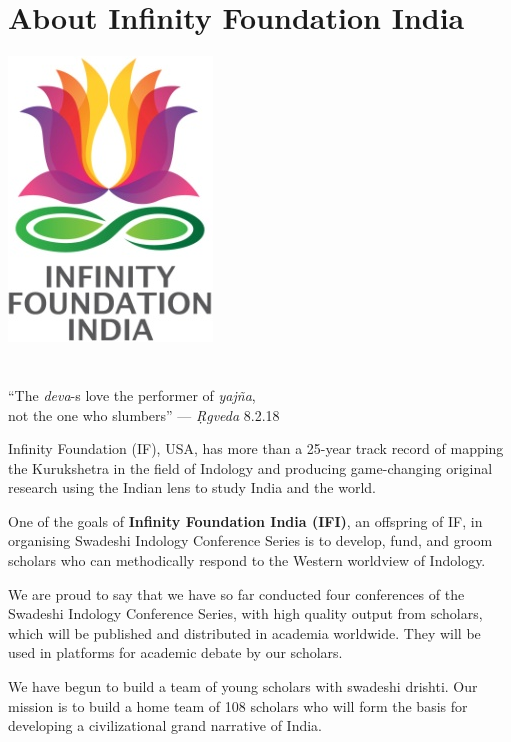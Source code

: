 
\chapter*{About Infinity Foundation India}\label{about}

\begin{center}
 \includegraphics[scale=0.23]{images/logo.png}\\\\\\
 “The \textit{deva}-s love the performer of \textit{yajña},\\ 
 not the one who slumbers” — \textit{Ṛgveda} 8.2.18
\end{center}

Infinity Foundation (IF), USA, has more than a 25-year track record of mapping the Kurukshetra in the field of Indology and producing game-changing original research using the Indian lens to study India and the world.

One of the goals of \textbf{Infinity Foundation India (IFI)}, an offspring of IF, in organising Swadeshi Indology Conference Series is to develop, fund, and groom scholars who can methodically respond to the Western worldview of Indology.

We are proud to say that we have so far conducted four conferences of the Swadeshi Indology Conference Series, with high quality output from scholars, which will be published and distributed in academia worldwide. They will be used in platforms for academic debate by our scholars.

We have begun to build a team of young scholars with swadeshi drishti. Our mission is to build a home team of 108 scholars who will form the basis for developing a civilizational grand narrative of India.

